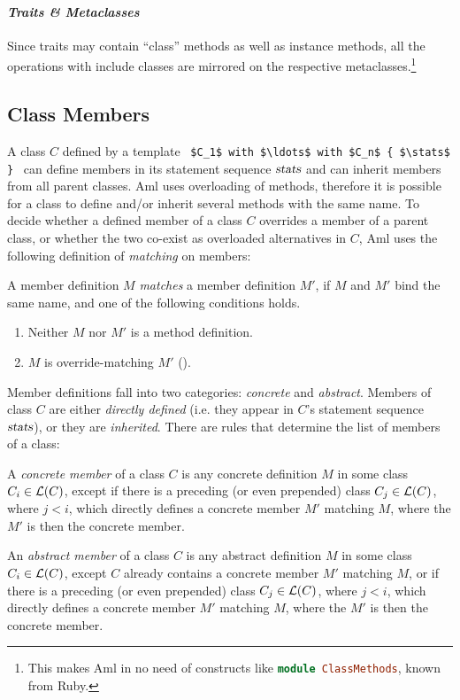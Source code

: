 \paragraph{\em Traits \& Metaclasses}
Since traits may contain ``class'' methods as well as instance methods, all the operations with include classes are mirrored on the respective metaclasses.\footnote{This makes Aml in no need of constructs like \lstinline[language=Ruby]!module ClassMethods!, known from Ruby.}





\subsection{Class Members}
\label{sec:class-members}

A class $C$ defined by a template ~\lstinline!$C_1$ with $\ldots$ with $C_n$ { $\stats$ }!~ can define members in its statement sequence $\mbox{\sl stats}$ and can inherit members from all parent classes. Aml uses overloading of methods, therefore it is possible for a class to define and/or inherit several methods with the same name. To decide whether a defined member of a class $C$ overrides a member of a parent class, or whether the two co-exist as overloaded alternatives in $C$, Aml uses the following definition of {\em matching} on members:

\begin{definition}
A member definition $M$ {\em matches} a member definition $M'$, if $M$ and $M'$ bind the same name, and one of the following conditions holds.
\begin{enumerate}
\item Neither $M$ nor $M'$ is a method definition.
\item $M$ is override-matching $M'$ (). 
\end{enumerate}
\end{definition}

Member definitions fall into two categories: {\em concrete} and {\em abstract}. Members of class $C$ are either {\em directly defined} (i.e. they appear in $C$'s statement sequence $\mbox{\sl stats}$), or they are {\em inherited}. There are rules that determine the list of members of a class:

\begin{definition}
A {\em concrete member} of a class $C$ is any concrete definition $M$ in some class $C_i \in {\cal L}(C)$, except if there is a preceding (or even prepended) class $C_j \in {\cal L}(C)$, where $j < i$, which directly defines a concrete member $M'$ matching $M$, where the $M'$ is then the concrete member. 

An {\em abstract member} of a class $C$ is any abstract definition $M$ in some class $C_i \in {\cal L}(C)$, except $C$ already contains a concrete member $M'$ matching $M$, or if there is a preceding (or even prepended) class $C_j \in {\cal L}(C)$, where $j < i$, which directly defines a concrete member $M'$ matching $M$, where the $M'$ is then the concrete member. 
\end{definition}

